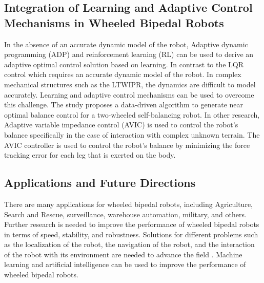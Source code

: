 \subsection{Integration of Learning and Adaptive Control Mechanisms in Wheeled Bipedal Robots}
In the absence of an accurate dynamic model of the robot, Adaptive dynamic programming (ADP) and reinforcement learning (RL) can be used to derive an adaptive optimal control solution based on learning.
In contrast to the LQR control which requires an accurate dynamic model of the robot.
In complex mechanical structures such as the LTWIPR, the dynamics are difficult to model accurately.
Learning and adaptive control mechanisms can be used to overcome this challenge. The study \cite{cui2021learning}proposes a data-driven algorithm to generate near optimal balance control for a two-wheeled self-balancing robot.
In other research, Adaptive variable impedance control (AVIC) is used to control the robot's balance specifically in the case of interaction with complex unknown terrain\cite{xu2020adaptive}.
The AVIC controller is used to control the robot's balance by minimizing the force tracking error for each leg that is exerted on the body.
\subsection{Applications and Future Directions}
There are many applications for wheeled bipedal robots, including Agriculture, Search and Rescue, surveillance, warehouse automation, military, and others.
Further research is needed to improve the performance of wheeled bipedal robots in terms of speed, stability, and robustness.
Solutions for different problems such as the localization of the robot, the navigation of the robot, and the interaction of the robot with its environment are needed to advance the field \cite{raj2022comprehensive}.
Machine learning and artificial intelligence can be used to improve the performance of wheeled bipedal robots\cite{kuutti2020survey}.

